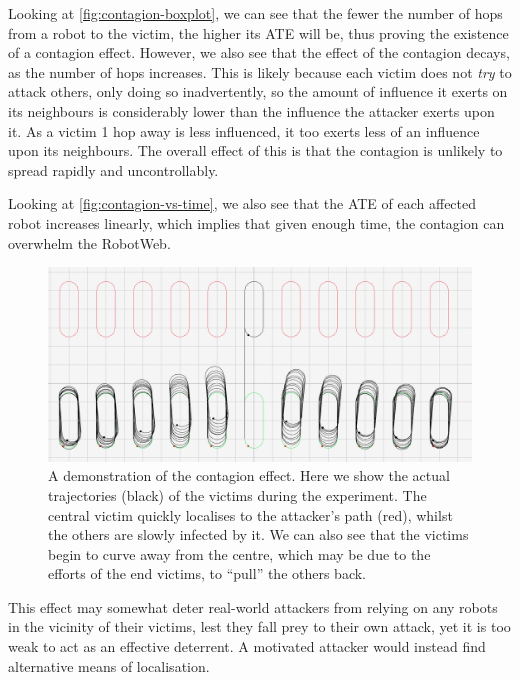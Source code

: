 Looking at \autoref{fig:contagion-boxplot}, we can see that the fewer the number of hops from a robot to the victim, the higher its ATE will be, thus proving the existence of a contagion effect. However, we also see that the effect of the contagion decays, as the number of hops increases. This is likely because each victim does not \textit{try} to attack others, only doing so inadvertently, so the amount of influence it exerts on its neighbours is considerably lower than the influence the attacker exerts upon it. As a victim 1 hop away is less influenced, it too exerts less of an influence upon its neighbours. The overall effect of this is that the contagion is unlikely to spread rapidly and uncontrollably.

Looking at \autoref{fig:contagion-vs-time}, we also see that the ATE of each affected robot increases linearly, which implies that given enough time, the contagion can overwhelm the RobotWeb.

\begin{figure}[!h]
    \centering
    \includegraphics[width=\textwidth]{report/diagrams/contagion.png}
    \caption{A demonstration of the contagion effect. Here we show the actual trajectories (black) of the victims during the experiment. The central victim quickly localises to the attacker's path (red), whilst the others are slowly infected by it. We can also see that the victims begin to curve away from the centre, which may be due to the efforts of the end victims, to ``pull'' the others back.}
    \label{fig:contagion-sim}
\end{figure}

This effect may somewhat deter real-world attackers from relying on any robots in the vicinity of their victims, lest they fall prey to their own attack, yet it is too weak to act as an effective deterrent. A motivated attacker would instead find alternative means of localisation.

